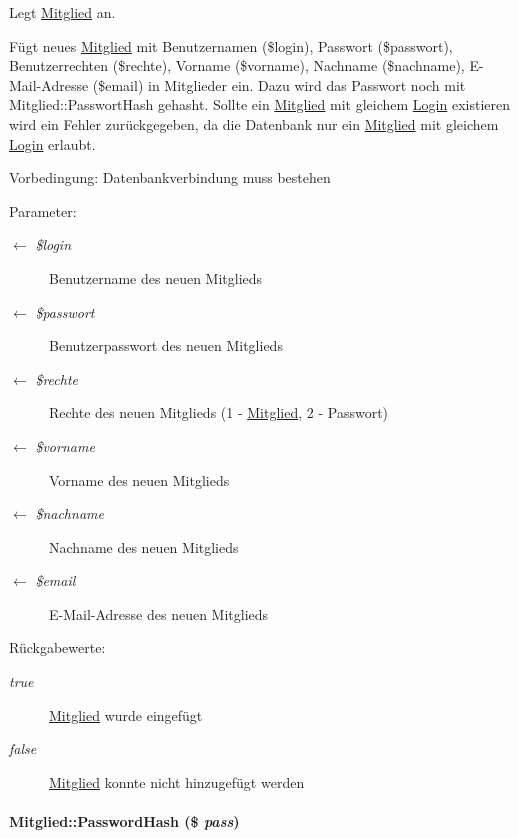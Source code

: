 Legt \hyperlink{classMitglied}{Mitglied} an. 

Fügt neues \hyperlink{classMitglied}{Mitglied} mit Benutzernamen (\$login), Passwort (\$passwort), Benutzerrechten (\$rechte), Vorname (\$vorname), Nachname (\$nachname), E-Mail-Adresse (\$email) in Mitglieder ein. Dazu wird das Passwort noch mit Mitglied::Passwort\-Hash gehasht. Sollte ein \hyperlink{classMitglied}{Mitglied} mit gleichem \hyperlink{classLogin}{Login} existieren wird ein Fehler zurückgegeben, da die Datenbank nur ein \hyperlink{classMitglied}{Mitglied} mit gleichem \hyperlink{classLogin}{Login} erlaubt. \begin{Desc}
\item[Vorbedingung:]Datenbankverbindung muss bestehen \end{Desc}
\begin{Desc}
\item[Parameter:]
\begin{description}
\item[\mbox{$\leftarrow$} {\em \$login}]Benutzername des neuen Mitglieds \item[\mbox{$\leftarrow$} {\em \$passwort}]Benutzerpasswort des neuen Mitglieds \item[\mbox{$\leftarrow$} {\em \$rechte}]Rechte des neuen Mitglieds (1 - \hyperlink{classMitglied}{Mitglied}, 2 - Passwort) \item[\mbox{$\leftarrow$} {\em \$vorname}]Vorname des neuen Mitglieds \item[\mbox{$\leftarrow$} {\em \$nachname}]Nachname des neuen Mitglieds \item[\mbox{$\leftarrow$} {\em \$email}]E-Mail-Adresse des neuen Mitglieds \end{description}
\end{Desc}
\begin{Desc}
\item[R\"{u}ckgabewerte:]
\begin{description}
\item[{\em true}]\hyperlink{classMitglied}{Mitglied} wurde eingefügt \item[{\em false}]\hyperlink{classMitglied}{Mitglied} konnte nicht hinzugefügt werden\end{description}
\end{Desc}
\hypertarget{classMitglied_9b13db80866c22bf992e73f2eb75e369}{
\paragraph[PasswordHash]{\setlength{\rightskip}{0pt plus 5cm}Mitglied::Password\-Hash (\$ {\em pass})}\hfill}
\label{classMitglied_9b13db80866c22bf992e73f2eb75e369}



